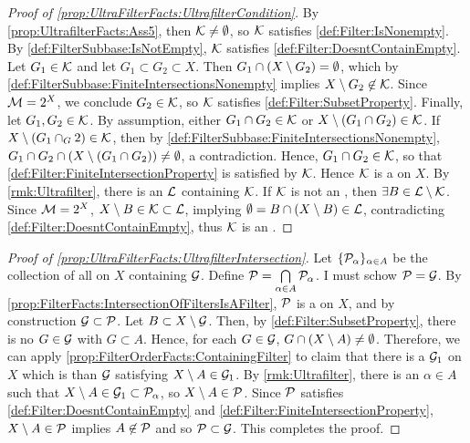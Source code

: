 \begin{prop}
\begin{proof}[Proof of \ref{prop:UltraFilterFacts:UltrafilterCondition}]
        By \ref{prop:UltrafilterFacts:Ass5}, then $\mathcal{K} \neq \emptyset$, so 
        $\mathcal{K}$ satisfies \ref{def:Filter:IsNonempty}.
        By \ref{def:FilterSubbase:IsNotEmpty}, $\mathcal{K}$ satisfies \ref{def:Filter:DoesntContainEmpty}.
        Let $G_1 \in \mathcal{K}$ and let $G_1 \subset G_2 \subset X$. 
        Then $G_1 \cap \left( X \setminus G_2\right) = \emptyset$, 
        which by 
        \ref{def:FilterSubbase:FiniteIntersectionsNonempty}
        implies $X \setminus G_2 \not \in \mathcal{K}$. 
        Since $\mathcal{M} = 2^{X}$, we conclude $G_2 \in \mathcal{K}$, so
        $\mathcal{K}$ satisfies \ref{def:Filter:SubsetProperty}. 
        Finally, let 
        $G_1,G_2 \in \mathcal{K}$. 
        By assumption, either $G_1 \cap G_2 \in \mathcal{K}$  or $X \setminus \left( G_1 \cap G_2 \right) \in \mathcal{K}$. 
        If $X \setminus \left( G_1 \cap _G2\right) \in \mathcal{K}$, then by 
        \ref{def:FilterSubbase:FiniteIntersectionsNonempty}, 
        $G_1 \cap G_2 \cap \left( X \setminus \left( G_1 \cap G_2\right)\right) \neq \emptyset$, a contradiction.
        Hence, $G_1 \cap G_2 \in \mathcal{K}$, so that \ref{def:Filter:FiniteIntersectionProperty}
        is satisfied by $\mathcal{K}$. 
        Hence $\mathcal{K}$ is a \Filter on $X$. 
        By \ref{rmk:Ultrafilter}, there is an \Ultrafilter $\mathcal{L}$ containing $\mathcal{K}$. 
        If $\mathcal{K}$ is not an \Ultrafilter, then $\exists B \in \mathcal{L} \setminus \mathcal{K}$. 
        Since $\mathcal{M} = 2^{X}$, $X \setminus B \in \mathcal{K} \subset \mathcal{L}$, 
        implying $\emptyset =B \cap \left( X \setminus B\right)  \in \mathcal{L}$, contradicting 
        \ref{def:Filter:DoesntContainEmpty}, thus
        $\mathcal{K}$ is an \Ultrafilter. 
    \end{proof}
    \begin{proof}[Proof of \ref{prop:UltraFilterFacts:UltrafilterIntersection}]
    Let $\{\mathcal{P}_\alpha\}_{\alpha \in A}$ be the collection of all 
    \Ultrafilters on $X$ containing $\mathcal{G}$. 
    Define $\mathcal{P}=\bigcap\limits_{\alpha \in A} \mathcal{P}_\alpha$. 
    I must schow $\mathcal{P}=\mathcal{G}$. 
    By \ref{prop:FilterFacts:IntersectionOfFiltersIsAFilter}, 
    $\mathcal{P}$ is a \Filter on $X$, and by construction
    $\mathcal{G} \subset \mathcal{P}$.
    Let $B \subset X \setminus \mathcal{G}$. 
    Then, by 
    \ref{def:Filter:SubsetProperty}, 
    there is no $G \in \mathcal{G}$ with $G \subset A$. 
    Hence, for each $G \in \mathcal{G}$, $G \cap \left( X \setminus A\right) \neq \emptyset$. 
    Therefore, we can apply \ref{prop:FilterOrderFacts:ContainingFilter}
    to claim that there is a \Filter $\mathcal{G}_1$ on $X$ which is \FinerFilter
    than $\mathcal{G}$ satisfying $X \setminus A \in \mathcal{G}_1$. 
    By \ref{rmk:Ultrafilter}, there is an $\alpha \in A$ such that 
    $X \setminus A \in \mathcal{G}_1 \subset \mathcal{P}_\alpha$, so 
    $X \setminus A \in \mathcal{P}$. 
    Since 
    $\mathcal{P}$ satisfies \ref{def:Filter:DoesntContainEmpty}
    and \ref{def:Filter:FiniteIntersectionProperty}, 
    $X \setminus A \in \mathcal{P} $
    implies $A \not \in \mathcal{P}$
    and so $\mathcal{P} \subset \mathcal{G}$. 
    This completes the proof. 
    \end{proof}
\end{prop}
